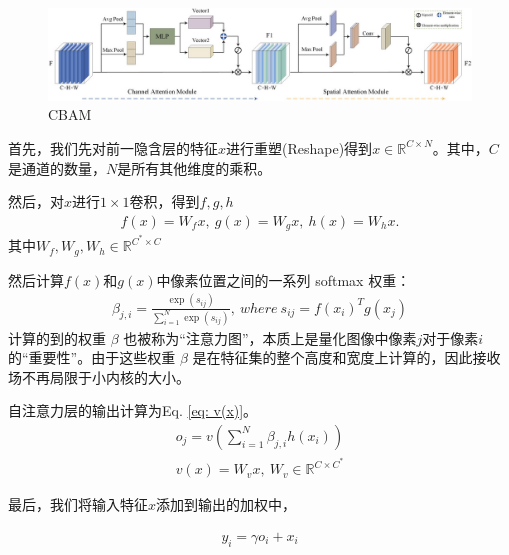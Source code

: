 \documentclass[a4paper]{ctexart}
\begin{document}
		\begin{figure}[htbp]
			\centering
			\includegraphics[width=\linewidth]{picture/LLIE/Experiment/CBAM}
			\caption{CBAM}
			\label{fig: CBAM}
		\end{figure}
		
		首先，我们先对前一隐含层的特征$x$进行重塑(Reshape)得到$x \in \mathbb{R}^{C \times N}$。其中，$C$是通道的数量，$N$是所有其他维度的乘积。
		
		然后，对$x$进行$1 \times 1$卷积，得到$f, g, h$
		\begin{equation}
			\begin{aligned}
				f(x) = W_f x, \
				g(x) = W_g x, \
				h(x) = W_h x.
			\end{aligned}
		\end{equation}
		其中$W_f, W_g, W_h \in \mathbb{R}^{C^{*} \times C}$
		
		然后计算$f(x)$和$g(x)$中像素位置之间的一系列 softmax 权重：
		\begin{equation}
			\begin{aligned}
				\beta_{j,i} = \frac{\exp(s_{ij})}{\sum_{i=1}^{N} \exp(s_{ij})}, \ where \ s_{ij} = f(x_i)^T g(x_j)
			\end{aligned}
		\end{equation}
		计算的到的权重 $\beta$ 也被称为“注意力图”，本质上是量化图像中像素$j$对于像素$i$的“重要性”。由于这些权重 $\beta$ 是在特征集的整个高度和宽度上计算的，因此接收场不再局限于小内核的大小。
		
		自注意力层的输出计算为Eq. \ref{eq: v(x)}。
		\begin{equation}
			\begin{aligned}
				o_j = v \left( \sum_{i=1}^{N} \beta_{j,i} h(x_i) \right) \\
				v(x) = W_v x, \ W_v \in \mathbb{R}^{C \times C^*}
			\end{aligned}
			\label{eq: v(x)}
		\end{equation}
		
		最后，我们将输入特征$x$添加到输出的加权中，
		
		\begin{equation}
			\begin{aligned}
				y_i = \gamma o_i + x_i
			\end{aligned}
		\end{equation}
		
\end{document}

